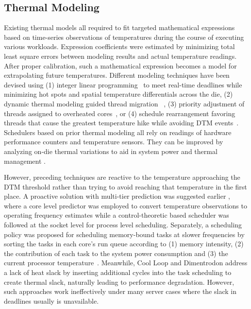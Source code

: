 \documentclass[times, 10pt,twocolumn]{IEEEtran}
\begin{document}
\subsection{Thermal Modeling}
\label{sec:thermal-modeling}
Existing thermal models all required to fit targeted mathematical
expressions based on time-series observations of temperatures during the
course of executing various workloads.  Expression coefficients were
estimated by minimizing total least square errors between modeling
results and actual temperature readings.  After proper calibration, such
a mathematical expression becomes a model for extrapolating future
temperatures.  Different modeling techniques have been devised using (1)
integer linear programming~\cite{Kursun2009} to meet real-time deadlines
while minimizing hot spots and spatial temperature differentials across
the die, (2) dynamic thermal modeling guided thread migration
~\cite{Gomaa2004}, (3)  priority adjustment of threads assigned to
overheated cores~\cite{Ayoub2011}, or (4) schedule rearrangement
favoring threads that cause the greatest temperature hike while avoiding
DTM events~\cite{Yang2008}. Schedulers based on prior thermal modeling
all rely on readings of hardware performance counters and temperature
sensors.  They can be improved by analyzing on-die thermal variations to
aid in system power and thermal management \cite{Bailis2011}.

However, preceding techniques are reactive to the temperature
approaching the DTM threshold rather than trying to avoid reaching that
temperature in the first place.  A proactive solution with multi-tier
prediction was suggested earlier \cite{Ayoub2011}, where a core level
predictor was employed to convert temperature observations to operating
frequency estimates while a control-theoretic based scheduler was
followed at the socket level for process level scheduling.  Separately,
a scheduling policy was proposed for scheduling memory-bound tasks at slower
frequencies by sorting the tasks in each core's run queue according to
(1) memory intensity, (2) the contribution of each task to the system
power consumption and (3) the current processor
temperature~\cite{Merkel2010}.   Meanwhile, Cool Loop
\cite{Choi2007} and Dimentrodon \cite{Bailis2011} address a lack of heat
slack by inserting additional cycles into the task scheduling to create
thermal slack, naturally leading to performance degradation.  However, such
approaches work ineffectively under many server cases where the slack
in deadlines usually is unavailable.
\end{document}
